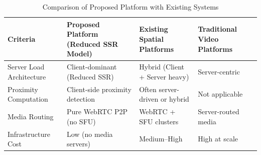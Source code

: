 \documentclass[10pt,a4paper]{article}
\begin{document}
\begin{table}[h]
\centering
\renewcommand{\arraystretch}{1.3}
\begin{tabular}{|p{3.5cm}|p{4cm}|p{4cm}|p{3.5cm}|}
\hline
\textbf{Criteria} & \textbf{Proposed Platform (Reduced SSR Model)} & \textbf{Existing Spatial Platforms} & \textbf{Traditional Video Platforms} \\
\hline
Server Load Architecture & Client-dominant (Reduced SSR) & Hybrid (Client + Server heavy) & Server-centric \\
\hline
Proximity Computation & Client-side proximity detection & Often server-driven or hybrid & Not applicable \\
\hline
Media Routing & Pure WebRTC P2P (no SFU) & WebRTC + SFU clusters & Server-routed media \\
\hline
Infrastructure Cost & Low (no media servers) & Medium--High & High at scale \\
\hline
\end{tabular}
\caption{Comparison of Proposed Platform with Existing Systems}
\label{tab:platform_comparison}
\end{table}
\end{document}
